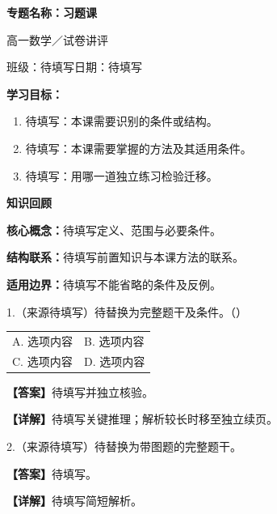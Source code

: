 \documentclass[UTF8,10pt,aspectratio=169]{ctexbeamer}
\makeatletter
\newcommand{\LessonTitle}{专题名称：习题课}
\newcommand{\LessonSubtitle}{高一数学／试卷讲评}
\newcommand{\LessonInfo}{班级：待填写\qquad 日期：待填写}
\newcommand{\PageHeading}[1]{\begin{center}{\Large\bfseries #1}\end{center}\vspace{0.2cm}}
\newcommand{\Answer}[1]{\par\vspace{0.2cm}\textbf{【答案】}#1}
\newcommand{\Analysis}[1]{\par\vspace{0.2cm}\textbf{【详解】}#1}
\newcommand{\Choices}[4]{\par\vspace{0.2cm}\begin{tabular}{@{}p{0.47\textwidth}p{0.47\textwidth}@{}}A. #1 & B. #2 \\[0.15cm] C. #3 & D. #4\end{tabular}}
\makeatother
\begin{document}
\begin{frame}
  \begin{center}
    {\Large\bfseries \LessonTitle}\par\vspace{0.5cm}
    {\large \LessonSubtitle}\par\vspace{0.4cm}
    \LessonInfo
  \end{center}
  \vspace{0.4cm}
  \textbf{学习目标：}
  \begin{enumerate}
    \item 待填写：本课需要识别的条件或结构。
    \item 待填写：本课需要掌握的方法及其适用条件。
    \item 待填写：用哪一道独立练习检验迁移。
  \end{enumerate}
\end{frame}

\begin{frame}
  \PageHeading{知识回顾}
  \textbf{核心概念：}待填写定义、范围与必要条件。
  \par\vspace{0.3cm}
  \textbf{结构联系：}待填写前置知识与本课方法的联系。
  \pause
  \par\vspace{0.3cm}
  \textbf{适用边界：}待填写不能省略的条件及反例。
\end{frame}

\begin{frame}
  1.（来源待填写）待替换为完整题干及条件。（\quad）
  \Choices{选项内容}{选项内容}{选项内容}{选项内容}
  \pause
  \Answer{待填写并独立核验。}
  \Analysis{待填写关键推理；解析较长时移至独立续页。}
\end{frame}

\begin{frame}
  2.（来源待填写）待替换为带图题的完整题干。
  \begin{center}
  \end{center}
  \pause
  \Answer{待填写。}
  \Analysis{待填写简短解析。}
\end{frame}
\end{document}
